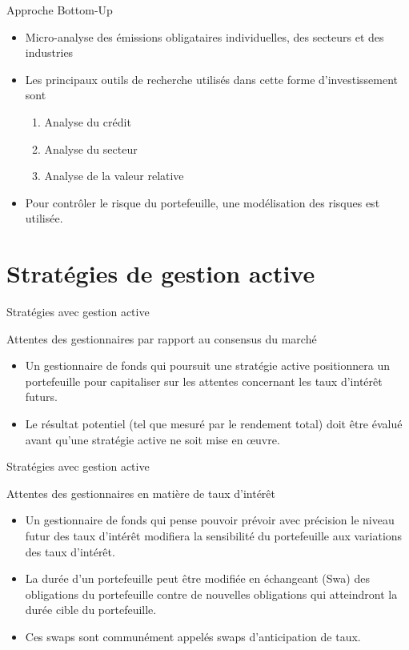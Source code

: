 \documentclass{beamer}
\begin{document}
\begin{frame}{Approche Bottom-Up}
\begin{itemize}[label=\bullet]
\item Micro-analyse des émissions obligataires individuelles, des secteurs et des industries
\item Les principaux outils de recherche utilisés dans cette forme d'investissement sont
\begin{enumerate}[label=\arabic*)]
\item Analyse du crédit
\item Analyse du secteur 
\item Analyse de la valeur relative
\end{enumerate}
\item Pour contrôler le risque du portefeuille, une modélisation des risques est utilisée.
\end{itemize}
\end{frame}

\section{Stratégies de gestion active}
\begin{frame}{Stratégies avec gestion active}
\begin{block}{Attentes des gestionnaires par rapport au consensus du marché}
\begin{itemize}[label=\bullet]
\item Un gestionnaire de fonds qui poursuit une stratégie active positionnera un portefeuille pour capitaliser sur les attentes concernant les taux d'intérêt futurs.
\item Le résultat potentiel (tel que mesuré par le rendement total) doit être évalué avant qu'une stratégie active ne soit mise en œuvre.
\end{itemize}
\end{block}
\end{frame}

\begin{frame}{Stratégies avec gestion active}
\begin{block}{Attentes des gestionnaires en matière de taux d'intérêt}
\begin{itemize}[label=\bullet]
\item Un gestionnaire de fonds qui pense pouvoir prévoir avec précision le niveau futur des taux d’intérêt modifiera la sensibilité du portefeuille aux variations des taux d’intérêt.
\item La durée d’un portefeuille peut être modifiée en échangeant (Swa) des obligations du portefeuille contre de nouvelles obligations qui atteindront la durée cible du portefeuille.
\item Ces swaps sont communément appelés swaps d'anticipation de taux.
\end{itemize}
\end{block}
\end{frame}
\end{document}

